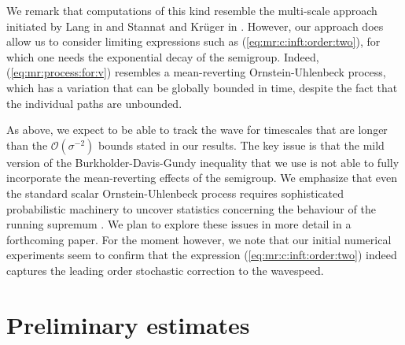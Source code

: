 \documentclass[10pt]{articleHJ}
\renewcommand{\O}{\ensuremath{\mathcal{O}}}
\newcommand{\sref}[1]{(\ref{#1})}                       %
\numberwithin{equation}{section}
\begin{document}
We remark that computations of this kind resemble the multi-scale
approach initiated by Lang in \cite{Lang} and Stannat
and Kr\"uger in \cite{kruger2017multiscale}.
However, our approach does allow us to
consider limiting expressions such as \sref{eq:mr:c:inft:order:two},
for which one needs the exponential decay of the semigroup.
Indeed, \sref{eq:mr:process:for:v}
resembles a mean-reverting Ornstein-Uhlenbeck process,
which has a variation that can be globally bounded in time,
despite the fact that the individual paths are unbounded.

As above, we expect
to be able to track the wave for timescales that
are longer than the $\O(\sigma^{-2})$ bounds stated in our results.
The key issue is that the mild version of the Burkholder-Davis-Gundy
inequality that we use is not able to fully incorporate the mean-reverting
effects of the semigroup.
We emphasize that even the standard scalar Ornstein-Uhlenbeck process
requires sophisticated probabilistic machinery to uncover
statistics concerning the behaviour of the running supremum
\cite{ricciardi1988first,alili2005representations}.
We plan to explore these issues
in more detail in a forthcoming paper.
For the moment however, we note that our %
initial numerical experiments seem to confirm that the
expression \sref{eq:mr:c:inft:order:two} indeed captures the leading order stochastic correction
to the wavespeed.


\section{Preliminary estimates}
\label{sec:prlm}
\end{document}
